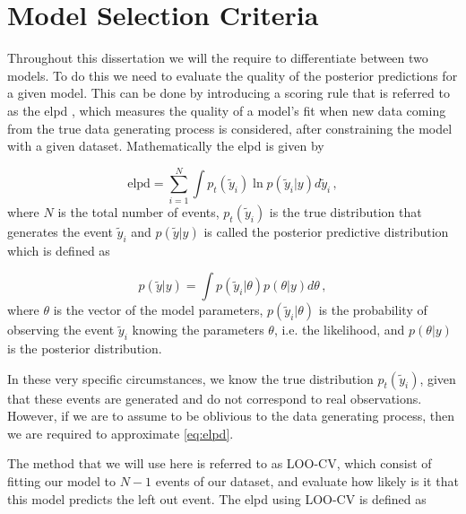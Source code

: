 \section{Model Selection Criteria}
\label{sec:model-selection-criteria}

Throughout this dissertation we will the require to differentiate between two models. To do this we need to evaluate the quality of the posterior predictions for a given model. This can be done by introducing a scoring rule that is referred to as the \gls{elpd} \cite{Gelman2013}, which measures the quality of a model's fit when new data coming from the true data generating process is considered, after constraining the model with a given dataset. Mathematically the \gls{elpd} is given by

\begin{equation}
    \label{eq:elpd}
    \text{elpd} = \sum_{i=1}^N \int p_t(\tilde{y}_i) \ln p(\tilde{y}_i|y) d\tilde{y}_i \,,
\end{equation}
where $N$ is the total number of events, $p_t(\tilde{y}_i)$ is the true distribution that generates the event $\tilde{y}_i$ and $p(\tilde{y}|y)$ is called the posterior predictive distribution which is defined as

\begin{equation}
    p(\tilde{y}|y) = \int p(\tilde{y}_i|\theta) p(\theta|y) d\theta \,,
\end{equation}
where $\theta$ is the vector of the model parameters, $p(\tilde{y}_i|\theta)$ is the probability of observing the event $\tilde{y}_i$ knowing the parameters $\theta$, i.e. the likelihood, and $p(\theta|y)$ is the posterior distribution.

In these very specific circumstances, we know the true distribution $p_t(\tilde{y}_i)$, given that these events are generated and do not correspond to real observations. However, if we are to assume to be oblivious to the data generating process, then we are required to approximate \cref{eq:elpd}.

The method that we will use here is referred to as \gls{LOO-CV}, which consist of fitting our model to $N-1$ events of our dataset, and evaluate how likely is it that this model predicts the left out event. The \gls{elpd} using \gls{LOO-CV} is defined as \cite{Vehtari2015}

